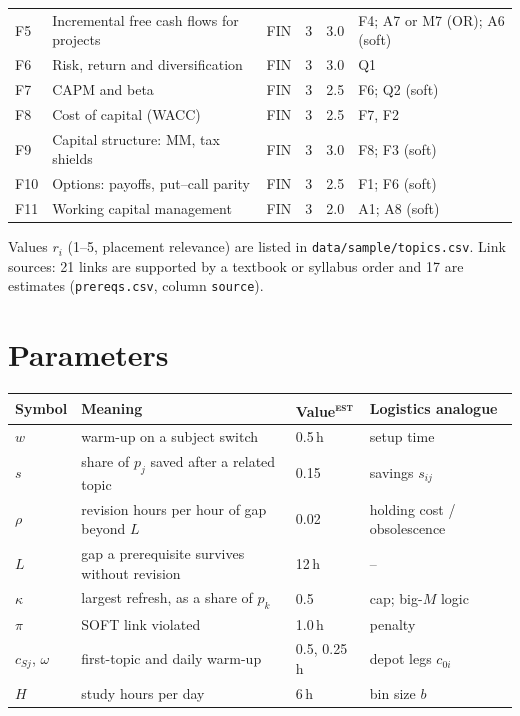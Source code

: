 \documentclass[11pt,a4paper]{article}
\newcommand{\est}{\textsuperscript{\textsc{est}}}
\begin{document}
{\begin{longtable}{@{}lp{6.3cm}lrrp{3.3cm}@{}}
F5 & Incremental free cash flows for projects & FIN & 3 & 3.0 & F4; A7 or M7 (OR); A6 (soft)\\
F6 & Risk, return and diversification & FIN & 3 & 3.0 & Q1\\
F7 & CAPM and beta & FIN & 3 & 2.5 & F6; Q2 (soft)\\
F8 & Cost of capital (WACC) & FIN & 3 & 2.5 & F7, F2\\
F9 & Capital structure: MM, tax shields & FIN & 3 & 3.0 & F8; F3 (soft)\\
F10 & Options: payoffs, put--call parity & FIN & 3 & 2.5 & F1; F6 (soft)\\
F11 & Working capital management & FIN & 3 & 2.0 & A1; A8 (soft)\\
\bottomrule
\end{longtable}}
\noindent Values $r_i$ (1--5, placement relevance) are listed in \texttt{data/sample/topics.csv}. Link sources: 21 links are supported by a textbook or syllabus order and 17 are estimates (\texttt{prereqs.csv}, column \texttt{source}).

\section{Parameters}
\begin{tabular}{@{}p{1.7cm}p{6.2cm}p{1.9cm}p{4.2cm}@{}}
\toprule
Symbol & Meaning & Value\est & Logistics analogue\\
\midrule
$w$ & warm-up on a subject switch & 0.5\,h & setup time\\
$s$ & share of $p_j$ saved after a related topic & 0.15 & savings $s_{ij}$\\
$\rho$ & revision hours per hour of gap beyond $L$ & 0.02 & holding cost / obsolescence\\
$L$ & gap a prerequisite survives without revision & 12\,h & --\\
$\kappa$ & largest refresh, as a share of $p_k$ & 0.5 & cap; big-$M$ logic\\
$\pi$ & SOFT link violated & 1.0\,h & penalty\\
$c_{Sj}$, $\omega$ & first-topic and daily warm-up & 0.5, 0.25\,h & depot legs $c_{0i}$\\
$H$ & study hours per day & 6\,h & bin size $b$\\
\bottomrule
\end{tabular}
\end{document}
